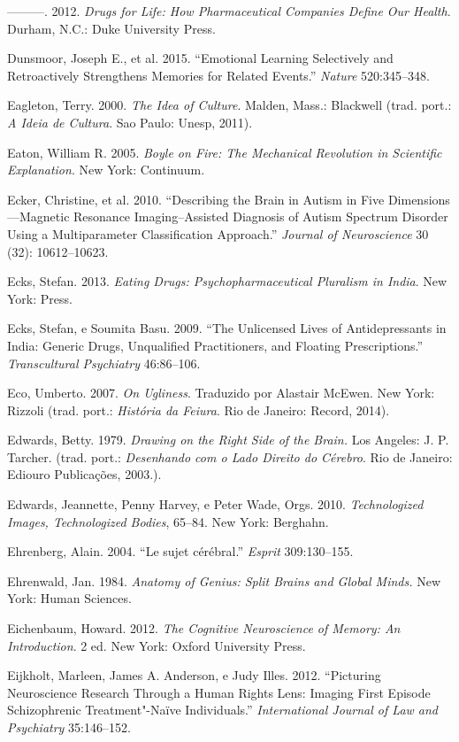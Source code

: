 ---------. 2012. \emph{Drugs for Life: How Pharmaceutical Companies
Define Our Health}. Durham, N.C.: Duke University Press.

Dunsmoor, Joseph E., et al. 2015. ``Emotional Learning Selectively and
Retroactively Strengthens Memories for Related Events.'' \emph{Nature}
520:345--348.

Eagleton, Terry. 2000. \emph{The Idea of Culture}. Malden, Mass.:
Blackwell (trad. port.: \emph{A Ideia de Cultura}. Sao Paulo: Unesp,
2011).

Eaton, William R. 2005. \emph{Boyle on Fire: The Mechanical Revolution
in Scientific Explanation}. New York: Continuum.

Ecker, Christine, et al. 2010. ``Describing the Brain in Autism in Five
Dimensions---Magnetic Resonance Imaging--Assisted Diagnosis of Autism
Spectrum Disorder Using a Multiparameter Classification Approach.''
\emph{Journal of Neuroscience} 30 (32): 10612--10623.

Ecks, Stefan. 2013. \emph{Eating Drugs: Psychopharmaceutical Pluralism
in India}. New York:  Press.

Ecks, Stefan, e Soumita Basu. 2009. ``The Unlicensed Lives of
Antidepressants in India: Generic Drugs, Unqualified Practitioners, and
Floating Prescriptions.'' \emph{Transcultural Psychiatry} 46:86--106.

Eco, Umberto. 2007. \emph{On Ugliness}. Traduzido por Alastair McEwen.
New York: Rizzoli (trad. port.: \emph{História da Feiura}. Rio de
Janeiro: Record, 2014).

Edwards, Betty. 1979. \emph{Drawing on the Right Side of the Brain.} Los
Angeles: J. P. Tarcher. (trad. port.: \emph{Desenhando com o Lado
Direito do Cérebro}. Rio de Janeiro: Ediouro Publicações, 2003.).

Edwards, Jeannette, Penny Harvey, e Peter Wade, Orgs. 2010.
\emph{Technologized Images, Technologized Bodies}, 65--84. New York:
Berghahn.

Ehrenberg, Alain. 2004. ``Le sujet cérébral.'' \emph{Esprit}
309:130--155.

Ehrenwald, Jan. 1984. \emph{Anatomy of Genius: Split Brains and Global
Minds.} New York: Human Sciences.

Eichenbaum, Howard. 2012. \emph{The Cognitive Neuroscience of Memory: An
Introduction}. 2 ed. New York: Oxford University Press.

Eijkholt, Marleen, James A. Anderson, e Judy Illes. 2012. ``Picturing
Neuroscience Research Through a Human Rights Lens: Imaging First Episode
Schizophrenic Treatment"-Naïve Individuals.'' \emph{International Journal
of Law and Psychiatry} 35:146--152.


